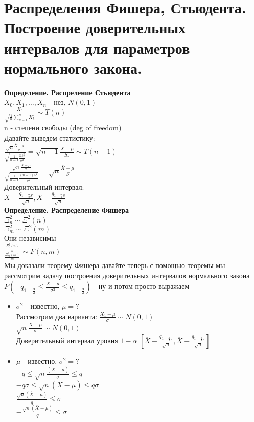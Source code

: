 \documentclass{article}
\newcommand\0{\mathbb{0}}
\newcommand\1{\mathbb{1}}
\begin{document}
\section{Распределения Фишера, Стьюдента. Построение доверительных интервалов для параметров
нормального закона.}
\textbf{Определение. Распреление Стьюдента}\\
$X_0, X_1, \dots, X_n$ - нез, $N(0, 1)$\\
$\frac{X_0}{\sqrt{\frac{1}{n}\displaystyle\sum_{k = 1}^n X_k^2}} \sim T(n)$\\
n - степени свободы (deg of freedom)\\
Давайте выведем статистику:\\
$\frac{\sqrt{n}\frac{\overline{X} - \mu}{\sigma}}{\sqrt{\frac{1}{n - 1}\frac{n s_*^2}{\sigma^2}}} = \sqrt{n - 1}\frac{\overline{X} - \mu}{S_*} \sim T(n - 1)$\\
$\frac{\sqrt{n}\frac{\overline{X} - \mu}{\sigma}}{\sqrt{\frac{1}{n - 1} \frac{(n - 1)S^2}{\sigma^2}}} = \sqrt{n}\frac{\overline{X} - \mu}{S}$\\
Доверительный интервал:\\
$\overline{X} - \frac{q_{1 - \frac{\alpha}{2}S}}{\sqrt{n}}, \overline{X} + \frac{q_{1 - \frac{\alpha}{2}S}}{\sqrt{n}}$\\
\textbf{Определение. Распределение Фишера}\\
$\Xi_n^2 \sim \Xi^2(n)$\\
$\Xi_m^2 \sim \Xi^2(m)$\\
Они независимы\\
$\frac{\frac{\Xi_n^2(n)}{n}}{\frac{\Xi_m^2(m)}{m}} \sim F(n, m)$\\
Мы доказали теорему Фишера давайте теперь с помощью теоремы мы рассмотрим задачу построения доверительных интервалов нормального закона\\
$P(-q_{1 - \frac{\alpha}{2}} \leq \frac{X - \mu}{\sigma^2} \leq q_{1 - \frac{\alpha}{2}})$ - ну и потом просто выражаем\\
\begin{itemize}
    \item $\sigma^2$ - известно, $\mu = ?$\\
    Рассмотрим два варианта: $\frac{X_1 - \mu}{\sigma} \sim N(0, 1)$\\
    $\sqrt{n}\frac{\overline{X} - \mu}{\sigma} \sim N(0, 1)$\\
    Доверительный интервал уровня $1 - \alpha$ $[\overline{X} - \frac{q_{1 - \frac{\alpha}{2}\sigma}}{\sqrt{n}}, \overline{X} + \frac{q_{1 - \frac{\alpha}{2}\sigma}}{\sqrt{n}}]$
    \item $\mu$ - известно, $\sigma^2 = ?$\\
    $-q \leq \sqrt{n}\frac{(\overline{X} - \mu)}{\sigma} \leq q$\\
    $-q\sigma \leq \sqrt{n}(\overline{X} - \mu) \leq q\sigma$\\
    $\frac{\sqrt{n}(\overline{X} - \mu)}{q} \leq \sigma$\\
    $-\frac{\sqrt{n}(\overline{X} - \mu)}{q} \leq \sigma$
\end{itemize}
\end{document}
